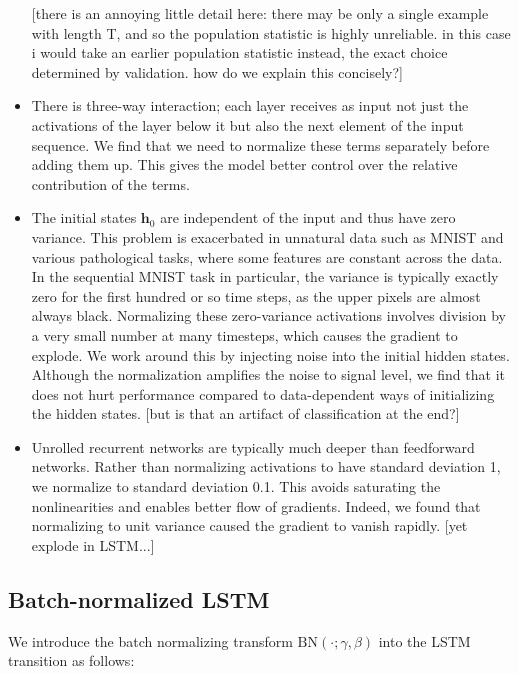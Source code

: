 \documentclass{article} %
\newcommand{\vect}[1]{\mathbf{#1}}
\begin{document}
\begin{itemize}
[there is an annoying little detail here: there may be only a single example with length T, and so the population statistic is highly unreliable. in this case i would take an earlier population statistic instead, the exact choice determined by validation. how do we explain this concisely?]
\\ \item
There is three-way interaction; each layer receives as input not just the activations of the layer below it but also the next element of the input sequence.
We find that we need to normalize these terms separately before adding them up.
This gives the model better control over the relative contribution of the terms.
\\ \item
The initial states $\vect{h}_0$ are independent of the input and thus have zero variance.
This problem is exacerbated in unnatural data such as MNIST and various pathological tasks, where some features are constant across the data.
In the sequential MNIST task in particular, the variance is typically exactly zero for the first hundred or so time steps, as the upper pixels are almost always black.
Normalizing these zero-variance activations involves division by a very small number at many timesteps, which causes the gradient to explode.
We work around this by injecting noise into the initial hidden states.
Although the normalization amplifies the noise to signal level, we find that it does not hurt performance compared to data-dependent ways of initializing the hidden states.
[but is that an artifact of classification at the end?]
\\ \item
Unrolled recurrent networks are typically much deeper than feedforward networks.
Rather than normalizing activations to have standard deviation 1, we normalize to standard deviation 0.1.
This avoids saturating the nonlinearities and enables better flow of gradients.
Indeed, we found that normalizing to unit variance caused the gradient to vanish rapidly.
[yet explode in LSTM...]
\end{itemize}

\subsection{Batch-normalized LSTM}

We introduce the batch normalizing transform $\mathrm{BN}(\cdot; \gamma, \beta)$ into the LSTM transition as follows:
\end{document}
